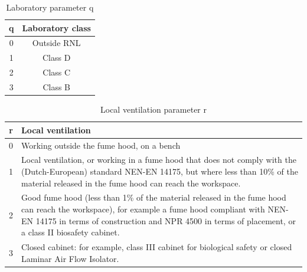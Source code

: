 \begin{table}
    \centering
\caption{Laboratory parameter q}
\label{tab:placeholder}
    \begin{tabular}{cc}\toprule
         q& Laboratory class\\\midrule
         0& Outside RNL\\
         1& Class D\\
         2& Class C\\
 3&Class B\\ \bottomrule
    \end{tabular}
    
    
\end{table}
\begin{table}[h]
    \centering
\caption{Local ventilation parameter r}
\label{tab:local_ventilation}
    \begin{tabular}{c>{\raggedright\arraybackslash}m{10cm}}
        \toprule
        \textbf{r} & \textbf{Local ventilation} \\ \midrule
        0 & Working outside the fume hood, on a bench \\ 
        1 & Local ventilation, or working in a fume hood that does not comply with the (Dutch-European) standard NEN-EN 14175, but where less than 10\% of the material released in the fume hood can reach the workspace. \\ 
        2 & Good fume hood (less than 1\% of the material released in the fume hood can reach the workspace), for example a fume hood compliant with NEN-EN 14175 in terms of construction and NPR 4500 in terms of placement, or a class II biosafety cabinet. \\ 
        3 & Closed cabinet: for example, class III cabinet for biological safety or closed Laminar Air Flow Isolator. \\ \bottomrule
    \end{tabular}
    
    
\end{table}




























